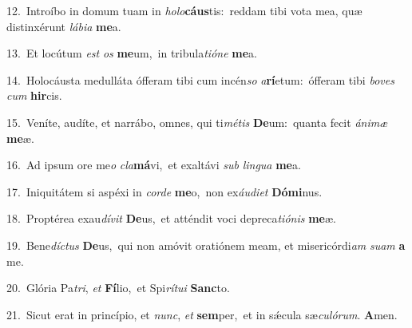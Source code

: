 {\numbfont\textcolor{\numbcolor}{12.}}~Introíbo in domum tuam in \textit{ho}\-\textit{lo}\textbf{cáus}tis:~\star reddam tibi vota mea, quæ distinxérunt \textit{lá}\-\textit{bi}\textit{a} \textbf{me}\-a.\par
{\numbfont\textcolor{\numbcolor}{13.}}~Et locútum \textit{est} \textit{os} \textbf{me}\-um,~\star in tribula\-\textit{ti}\-\textit{ó}\textit{ne} \textbf{me}\-a.\par
{\numbfont\textcolor{\numbcolor}{14.}}~Holocáusta medulláta ófferam tibi cum incén\textit{so} \textit{a}\-\textbf{rí}etum:~\star ófferam tibi \textit{bo}\-\textit{ves} \textit{cum} \textbf{hir}\-cis.\par
{\numbfont\textcolor{\numbcolor}{15.}}~Veníte, audíte, et narrábo, omnes, qui ti\-\textit{mé}\-\textit{tis} \textbf{De}\-um:~\star quanta fecit \textit{á}\-\textit{ni}\textit{mæ} \textbf{me}\-æ.\par
{\numbfont\textcolor{\numbcolor}{16.}}~Ad ipsum ore me\textit{o} \textit{cla}\-\textbf{má}vi,~\star et exaltávi \textit{sub} \textit{lin}\-\textit{gua} \textbf{me}\-a.\par
{\numbfont\textcolor{\numbcolor}{17.}}~Iniquitátem si aspéxi in \textit{cor}\-\textit{de} \textbf{me}\-o,~\star non ex\-\textit{áu}\-\textit{di}\textit{et} \textbf{Dó}\-\textbf{mi}nus.\par
{\numbfont\textcolor{\numbcolor}{18.}}~Proptérea exau\-\textit{dí}\-\textit{vit} \textbf{De}\-us,~\star et atténdit voci depreca\-\textit{ti}\-\textit{ó}\textit{nis} \textbf{me}\-æ.\par
{\numbfont\textcolor{\numbcolor}{19.}}~Bene\-\textit{díc}\-\textit{tus} \textbf{De}\-us,~\star qui non amóvit oratiónem meam, et misericórdi\textit{am} \textit{su}\-\textit{am} \textbf{a} me.\par
{\numbfont\textcolor{\numbcolor}{20.}}~Glória Pa\-\textit{tri}\-, \textit{et} \textbf{Fí}\-lio,~\star et Spi\-\textit{rí}\-\textit{tu}\textit{i} \textbf{Sanc}\-to.\par
{\numbfont\textcolor{\numbcolor}{21.}}~Sicut erat in princípio, et \textit{nunc}\-, \textit{et} \textbf{sem}\-per,~\star et in sǽcula sæ\-\textit{cu}\-\textit{ló}\textit{rum}. \textbf{A}\-men.\par
